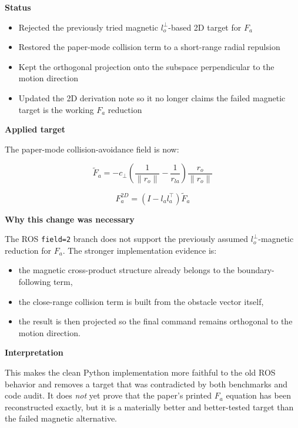 \documentclass[11pt]{article}
\begin{document}
\textbf{Status}

\begin{itemize}[leftmargin=*]
  \item Rejected the previously tried magnetic \(l_o^\perp\)-based 2D target for \(F_a\)
  \item Restored the paper-mode collision term to a short-range radial repulsion
  \item Kept the orthogonal projection onto the subspace perpendicular to the motion direction
  \item Updated the 2D derivation note so it no longer claims the failed magnetic target is the working \(F_a\) reduction
\end{itemize}

\textbf{Applied target}

The paper-mode collision-avoidance field is now:

\begin{equation}
\tilde{F}_a
=
-c_\perp
\left(
\frac{1}{\lVert r_o \rVert} - \frac{1}{r_{la}}
\right)
\frac{r_o}{\lVert r_o \rVert}
\end{equation}

\begin{equation}
F_a^{2D} = \left(I-l_a l_a^\top\right)\tilde{F}_a
\end{equation}

\textbf{Why this change was necessary}

The ROS \texttt{field=2} branch does not support the previously assumed
\(l_o^\perp\)-magnetic reduction for \(F_a\). The stronger implementation
evidence is:

\begin{itemize}[leftmargin=*]
  \item the magnetic cross-product structure already belongs to the boundary-following term,
  \item the close-range collision term is built from the obstacle vector itself,
  \item the result is then projected so the final command remains orthogonal to the motion direction.
\end{itemize}

\textbf{Interpretation}

This makes the clean Python implementation more faithful to the old ROS
behavior and removes a target that was contradicted by both benchmarks and code
audit. It does \emph{not} yet prove that the paper's printed \(F_a\) equation
has been reconstructed exactly, but it is a materially better and better-tested
target than the failed magnetic alternative.
\end{document}
